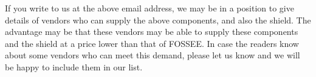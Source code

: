 If you write to us at the above email address, we may be in a position
to give details of vendors who can supply the above components, and
also the shield.  The advantage may be that these vendors may be able
to supply these components and the shield at a price lower than that
of FOSSEE.  In case the readers know about some vendors who can meet
this demand, please let us know and we will be happy to include them
in our list.
